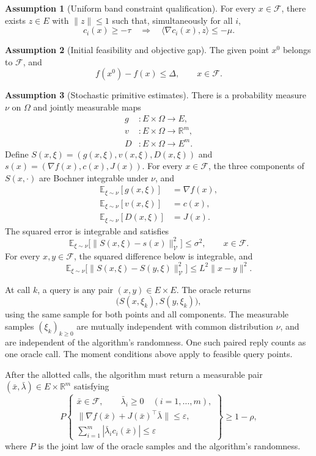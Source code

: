 \documentclass[10pt]{article}
\theoremstyle{definition}
\newtheorem{assumption}{Assumption}
\begin{document}
\begin{assumption}[Uniform band constraint qualification]
For every $x\in\mathcal F$, there exists $z\in E$ with $\|z\|\leq1$ such that, simultaneously for all $i$,
\[
 c_i(x)\geq-\tau
 \quad\Longrightarrow\quad
 \langle\nabla c_i(x),z\rangle\leq-\mu.
\]
\end{assumption}

\begin{assumption}[Initial feasibility and objective gap]
The given point $x^0$ belongs to $\mathcal F$, and
\[
 f(x^0)-f(x)\leq\Delta,
 \qquad x\in\mathcal F.
\]
\end{assumption}

\begin{assumption}[Stochastic primitive estimates]
There is a probability measure $\nu$ on $\Omega$ and jointly measurable maps
\[
\begin{aligned}
 g &:E\times\Omega\to E,\\
 v &:E\times\Omega\to\mathbb{R}^m,\\
 D &:E\times\Omega\to E^m.
\end{aligned}
\]
Define $S(x,\xi)=(g(x,\xi),v(x,\xi),D(x,\xi))$ and $s(x)=(\nabla f(x),c(x),J(x))$. For every $x\in\mathcal F$, the three components of $S(x,\cdot)$ are Bochner integrable under $\nu$, and
\[
\begin{aligned}
\mathbb{E}_{\xi\sim\nu}[g(x,\xi)]&=\nabla f(x),\\
\mathbb{E}_{\xi\sim\nu}[v(x,\xi)]&=c(x),\\
\mathbb{E}_{\xi\sim\nu}[D(x,\xi)]&=J(x).
\end{aligned}
\]
The squared error is integrable and satisfies
\[
\mathbb{E}_{\xi\sim\nu}
 \bigl[\|S(x,\xi)-s(x)\|_{\mathcal V}^2\bigr]
\leq\sigma^2,
\qquad x\in\mathcal F.
\]
For every $x,y\in\mathcal F$, the squared difference below is integrable, and
\[
\mathbb{E}_{\xi\sim\nu}
 \bigl[\|S(x,\xi)-S(y,\xi)\|_{\mathcal V}^2\bigr]
\leq L^2\|x-y\|^2.
\]
\end{assumption}

At call $k$, a query is any pair $(x,y)\in E\times E$. The oracle returns
\[
\bigl(S(x,\xi_k),S(y,\xi_k)\bigr),
\]
using the same sample for both points and all components. The measurable samples $(\xi_k)_{k\geq0}$ are mutually independent with common distribution $\nu$, and are independent of the algorithm's randomness. One such paired reply counts as one oracle call. The moment conditions above apply to feasible query points.

After the allotted calls, the algorithm must return a measurable pair $(\bar{x},\bar{\lambda})\in E\times\mathbb{R}^m$ satisfying
\[
P\!\left\{
\begin{gathered}
\bar{x}\in\mathcal F,\qquad \bar{\lambda}_i\geq0
\quad(i=1,\ldots,m),\\
\|\nabla f(\bar{x})+J(\bar{x})^\top\bar{\lambda}\|
\leq\varepsilon,\\
\displaystyle\sum_{i=1}^m
 |\bar{\lambda}_i c_i(\bar{x})|\leq\varepsilon
\end{gathered}
\right\}\geq1-\rho,
\]
where $P$ is the joint law of the oracle samples and the algorithm's randomness.
\end{document}
